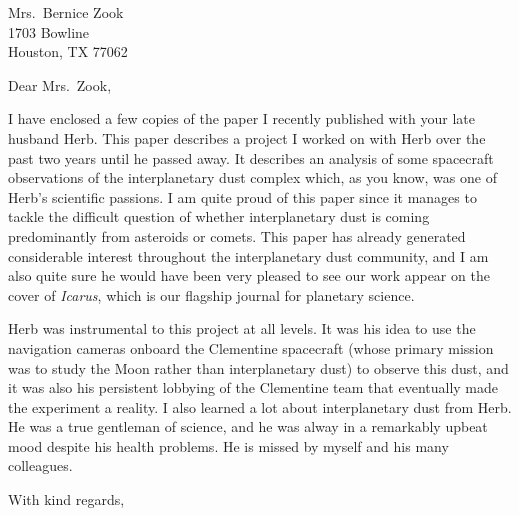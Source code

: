 \documentclass[12pt]{letter}
\begin{document}
\parindent=25pt

\address{Lunar and Planetary Institute\\
         3600 Bay Area Boulevard\\
         Houston, TX 77058\\
	 hahn@lpi.usra.edu\\
	 281--486--2113}

\signature{Joseph M. Hahn}
\date{\today}

\begin{letter}{
Mrs.\ Bernice Zook\\
1703 Bowline\\
Houston, TX 77062
}
\opening{\noindent Dear Mrs.\ Zook,}

\indent I have enclosed a few copies of the paper I recently
published with your late husband Herb. This paper describes a
project I worked on with Herb over the past two years until he
passed away. It describes an analysis of some spacecraft
observations of the interplanetary dust complex which, as you
know, was one of Herb's scientific passions. I am quite proud of
this paper since it manages to tackle the difficult question of
whether interplanetary dust is coming predominantly from
asteroids or comets. This paper has already generated
considerable interest throughout the interplanetary
dust community, and I am also quite
sure he would have been very pleased to see our work
appear on the cover of {\it Icarus}, which is our flagship
journal for planetary science.

Herb was instrumental to this project at all levels. It was his
idea to use the navigation cameras onboard the Clementine
spacecraft (whose primary mission was to study the Moon rather
than interplanetary dust) to observe this dust, and it was
also his persistent lobbying of the Clementine team that
eventually made the experiment a reality. I also learned a lot
about interplanetary dust from Herb. He was a true gentleman of
science, and he was alway in a remarkably upbeat mood despite
his health problems.
He is missed by myself and his many colleagues.

\closing{With kind regards,}
\end{letter}
\end{document}
